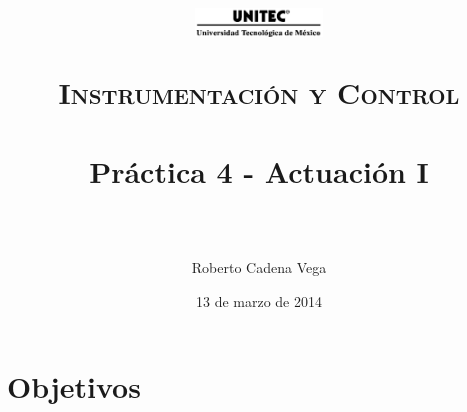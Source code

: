 



\title{	
	\normalfont \normalsize
	\begin{figure}[h]
		\begin{center}
			\includegraphics[width=0.3\textwidth]{../../images/UNITEC.png} %
		\end{center}
	\end{figure}
	\textsc{Instrumentación y Control} \\ [25pt]
	\horrule{0.5pt} \\[0.4cm] %
	\huge Práctica 4 - Actuación I \\ %
	\horrule{2pt} \\[0.5cm] %
}

\author{Roberto Cadena Vega} %

\date{\normalsize 13 de marzo de 2014} %




\maketitle %


\section{Objetivos}

